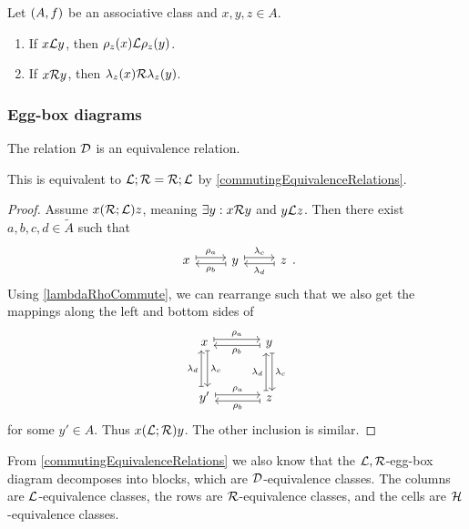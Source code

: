 \begin{lemma} \label{lambdaRhoPreservation}
Let $\left( A, f \right)$ be an associative class and $x, y, z\in A$.
\begin{enumerate}
\item If $x\mathcal{L} y$, then $\rho_z(x)\mathcal{L} \rho_z(y)$.
\item If $x\mathcal{R} y$, then $\lambda_z(x)\mathcal{R} \lambda_z(y)$.
\end{enumerate}
\end{lemma}



\subsubsection{Egg-box diagrams}
\begin{proposition} \label{greensDequivalence}
The relation $\mathcal{D}$ is an equivalence relation.
\end{proposition}
This is equivalent to $\mathcal{L};\mathcal{R} = \mathcal{R};\mathcal{L}$ by \ref{commutingEquivalenceRelations}. 
\begin{proof}
Assume $x(\mathcal{R};\mathcal{L})z$, meaning $\exists y: x\mathcal{R} y$ and $y\mathcal{L} z$. Then there exist $a,b,c,d\in \widetilde{A}$ such that
\[ \begin{tikzcd}
x \ar[r, maps to, shift left, "\rho_a"] & y \ar[l, maps to, shift left, "\rho_b"] \ar[r, maps to, shift left, "\lambda_c"] & z \ar[l, maps to, shift left, "\lambda_d"]
\end{tikzcd}. \]
Using \ref{lambdaRhoCommute}, we can rearrange such that we also get the mappings along the left and bottom sides of
\[ \begin{tikzcd}[sep=large]
x \ar[r, maps to, shift left, "\rho_a"] \ar[d, maps to, shift left, "\lambda_c"] & y \ar[l, maps to, shift left, "\rho_b"] \ar[d, maps to, shift left, "\lambda_c"] \\
y' \ar[u, maps to, shift left, "\lambda_d"] \ar[r, maps to, shift left, "\rho_a"] & z \ar[u, maps to, shift left, "\lambda_d"] \ar[l, maps to, shift left, "\rho_b"]
\end{tikzcd} \]
for some $y' \in A$. Thus $x(\mathcal{L};\mathcal{R})y$. The other inclusion is similar.
\end{proof}

From \ref{commutingEquivalenceRelations} we also know that the $\mathcal{L},\mathcal{R}$-egg-box diagram decomposes into blocks, which are $\mathcal{D}$-equivalence classes. The columns are $\mathcal{L}$-equivalence classes, the rows are $\mathcal{R}$-equivalence classes, and the cells are $\mathcal{H}$-equivalence classes.

